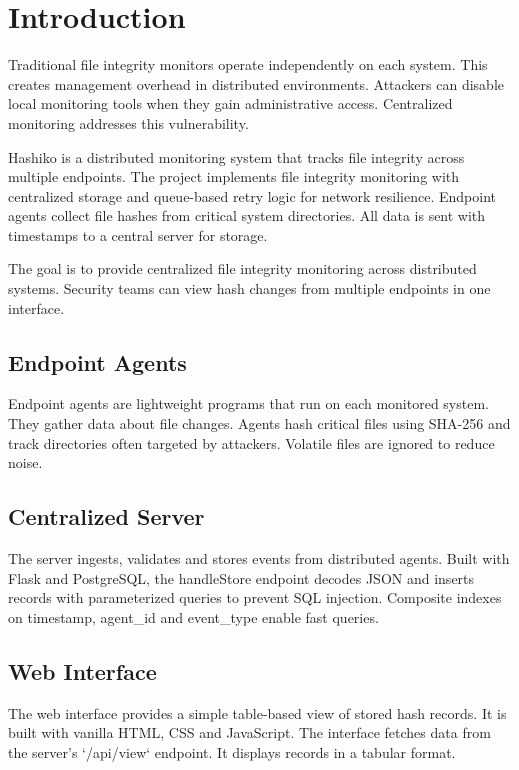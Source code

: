 \documentclass[conference]{IEEEtran}
\begin{document}
\section{Introduction}

Traditional file integrity monitors operate independently on each system. This creates management overhead in distributed environments. Attackers can disable local monitoring tools when they gain administrative access. Centralized monitoring addresses this vulnerability.

Hashiko is a distributed monitoring system that tracks file integrity across multiple endpoints. The project implements file integrity monitoring with centralized storage and queue-based retry logic for network resilience. Endpoint agents collect file hashes from critical system directories. All data is sent with timestamps to a central server for storage.

The goal is to provide centralized file integrity monitoring across distributed systems. Security teams can view hash changes from multiple endpoints in one interface.

\subsection{Endpoint Agents}

Endpoint agents are lightweight programs that run on each monitored system. They gather data about file changes. Agents hash critical files using SHA-256 and track directories often targeted by attackers. Volatile files are ignored to reduce noise.

\subsection{Centralized Server}
The server ingests, validates and stores events from distributed agents. Built with Flask and PostgreSQL, the handleStore endpoint decodes JSON and inserts records with parameterized queries to prevent SQL injection. Composite indexes on timestamp, agent\_id and event\_type enable fast queries.

\subsection{Web Interface}

The web interface provides a simple table-based view of stored hash records. It is built with vanilla HTML, CSS and JavaScript. The interface fetches data from the server's `/api/view` endpoint. It displays records in a tabular format.
\end{document}
